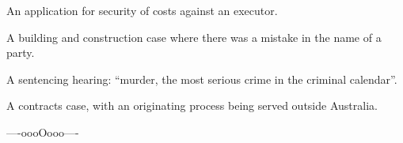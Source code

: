 \setnumparshiftleft{}
\setnumparfillright{\hspace{3pt}--\hspace{3pt}}
\setnumparformat{\color{red}}
\setnumpardelimleft{[}
\setnumpardelimright{]}
\p An application for security of costs against an executor.

\p A building and construction case where there was a mistake in the name of a party.

\p A sentencing hearing: ``murder, the most serious crime in the criminal calendar''.

\p A contracts case, with an originating process being served outside Australia.

\bigskip
\bigskip
\hfill ----oooOooo---- \hfill\ 
